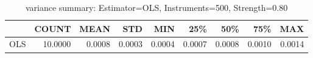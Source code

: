 \begin{table}[ht]
\centering
\caption{variance summary: Estimator=OLS, Instruments=500, Strength=0.80}
\begin{tabular}{lrrrrrrrr}
\toprule
 & COUNT & MEAN & STD & MIN & 25\% & 50\% & 75\% & MAX \\
\midrule
OLS & 10.0000 & 0.0008 & 0.0003 & 0.0004 & 0.0007 & 0.0008 & 0.0010 & 0.0014 \\
\bottomrule
\end{tabular}
\end{table}
